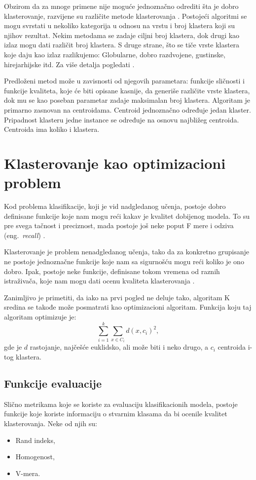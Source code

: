\documentclass[a4paper,serbian]{symopissr}
\begin{document}
Obzirom da za mnoge primene nije moguće jednoznačno odrediti šta je dobro klasterovanje, razvijene su različite metode klasterovanja \cite{rad}.
Postojeći algoritmi se mogu svrstati u nekoliko kategorija u odnosu na vrstu i broj klastera koji su njihov rezultat.
Nekim metodama se zadaje ciljni broj klastera, dok drugi kao izlaz mogu dati različit broj klastera.
S druge strane, što se tiče vrste klastera koje daju kao izlaz razlikujemo: Globularne, dobro razdvojene, gustinske, hirejarhijske itd. Za više detalja pogledati \cite{ml_mladen}.

Predloženi metod može u zavisnosti od njegovih parametara: funkcije sličnosti i funkcije kvaliteta, koje će biti opisane kasnije, da generiše različite vrste klastera, dok mu se kao poseban parametar zadaje maksimalan broj klastera.
Algoritam je primarno zasnovan na centroidama. Centroid jednoznačno određuje jedan klaster. Pripadnost klasteru jedne instance se određuje na osnovu najbližeg centroida. Centroida ima koliko i klastera.
\\
\section{Klasterovanje kao optimizacioni problem}
\label{sec:klasterovanje}
Kod problema klasifikacije, koji je vid nadgledanog učenja, postoje dobro definisane funkcije koje nam mogu reći kakav je kvalitet dobijenog modela. To su pre svega tačnost i preciznost, mada postoje još neke poput F mere i odziva (eng.~{\em recall}) \cite{information}.

Klasterovanje je problem nenadgledanog učenja,
 tako da za konkretno grupisanje ne postoje jednoznačne funkcije koje nam sa sigurnošću mogu reći koliko je ono dobro. Ipak, postoje neke funkcije, definisane tokom vremena od raznih istraživača, koje nam mogu dati ocenu kvaliteta klasterovanja \cite{db_index}\cite{ch_score}\cite{rad_1}.

Zanimljivo je primetiti, da iako na prvi pogled ne deluje tako, algoritam K sredina se takođe može posmatrati kao optimizacioni algoritam. Funkcija koju taj algoritam optimizuje je:
%
\begin{equation}
\sum_{i=1}^{k}\sum_{x \in C_i} d(x, c_i)^2,
\end{equation}
%
gde je $d$ rastojanje, najčešće euklidsko, ali može biti i neko drugo, a $c_i$ centroida i-tog klastera. 
\subsection{Funkcije evaluacije}
Slično metrikama koje se koriste za evaluaciju klasifikacionih modela, postoje funkcije koje koriste informaciju o stvarnim klasama da bi ocenile kvalitet klasterovanja. Neke od njih su:
\begin{itemize}
	\item Rand indeks,
	\item Homogenost,
	\item V-mera.
\end{itemize}  
\end{document}
